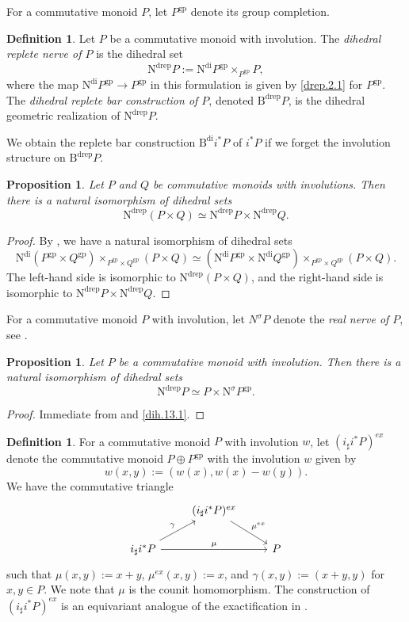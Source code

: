 \documentclass[10pt]{amsart}
\newtheorem{prop}[thm]{Proposition}
\theoremstyle{definition}
\newtheorem{df}[thm]{Definition}
\theoremstyle{remark}
\numberwithin{equation}{section}
\newcommand{\Bdi}{\mathrm{B}^{\mathrm{di}}}
\newcommand{\Bdrep}{\mathrm{B}^\mathrm{drep}}
\newcommand{\Ndrep}{\mathrm{N}^\mathrm{drep}}
\newcommand{\Ndi}{\mathrm{N}^\mathrm{di}}
\newcommand{\Nsigma}{\mathrm{N}^\sigma}
\newcommand{\gp}{\mathrm{gp}}
\begin{document}
For a commutative monoid $P$,
let $P^\gp$ denote its group completion.

\begin{df}
\label{dih.13}
Let $P$ be a commutative monoid with involution.
The \emph{dihedral replete nerve of $P$} is the dihedral set
\begin{equation}
\label{dih.13.1}
\Ndrep P
:=
\Ndi P^\gp \times_{P^\gp} P,
\end{equation}
where the map $\Ndi P^\gp\to P^\gp$ in this formulation is given by \eqref{drep.2.1} for $P^\gp$.
The \emph{dihedral replete bar construction of $P$}, denoted $\Bdrep P$,
is the dihedral geometric realization of $\Ndrep P$.

We obtain the replete bar construction $\Bdi i^*P$ \cite[Definition 3.16]{Rog09} of $i^*P$ if we forget the involution structure on $\Bdrep P$.
\end{df}



\begin{prop}
\label{drep.4}
Let $P$ and $Q$ be commutative monoids with involutions.
Then there is a natural isomorphism of dihedral sets
\[
\Ndrep (P\times Q)
\simeq
\Ndrep P \times \Ndrep Q.
\]
\end{prop}
\begin{proof}
By \cite[Proposition 4.2.4]{THR},
we have a natural isomorphism of dihedral sets
\[
\Ndi (P^\gp \times Q^\gp) \times_{P^\gp \times Q^\gp} (P\times Q)
\simeq
(\Ndi P^\gp \times \Ndi Q^\gp) \times_{P^\gp \times Q^\gp} (P\times Q).
\]
The left-hand side is isomorphic to $\Ndrep (P\times Q)$,
and the right-hand side is isomorphic to $\Ndrep P \times \Ndrep Q$.
\end{proof}

For a commutative monoid $P$ with involution,
let $N^\sigma P$ denote the \emph{real nerve of $P$},
see \cite[Definition 4.2.1]{THR}.

\begin{prop}
\label{dih.25}
Let $P$ be a commutative monoid with involution.
Then there is a natural isomorphism of dihedral sets
\[
\Ndrep P
\simeq
P\times \Nsigma P^\gp.
\]
\end{prop}
\begin{proof}
Immediate from \cite[Proposition 4.2.6]{THR} and \eqref{dih.13.1}.
\end{proof}


\begin{df}
\label{dih.14}
For a commutative monoid $P$ with involution $w$,
let $(i_\sharp i^*P)^{ex}$ denote the commutative monoid $P\oplus P^\gp$ with the involution $w$ given by
\[
w(x,y):=(w(x),w(x)-w(y)).
\]
We have the commutative triangle
\[
\begin{tikzcd}
& (i_\sharp i^*P)^{ex}\ar[rd,"\mu^{ex}"]
\\
i_\sharp i^*P\ar[ru,"\gamma"]\ar[rr,"\mu"]&
&
P
\end{tikzcd}
\]
such that $\mu(x,y):=x+y$, $\mu^{ex}(x,y):=x$, and $\gamma(x,y):=(x+y,y)$ for $x,y\in P$.
We note that $\mu$ is the counit homomorphism.
The construction of $(i_\sharp i^*P)^{ex}$ is an equivariant analogue of the exactification in \cite[Proposition I.4.2.19]{Ogu}.
\end{df}
\end{document}
